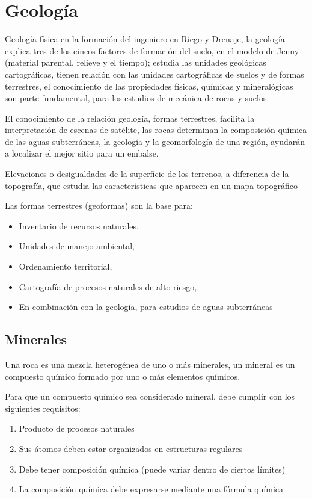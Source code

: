 \chapter{Geología}

Geología física en la formación del ingeniero en Riego y Drenaje, 
la geología explica tres de los cincos factores de formación del suelo, en el modelo de Jenny (material parental, relieve y el tiempo); estudia las unidades geológicas cartográficas, tienen relación con las unidades cartográficas de suelos y de formas terrestres, el conocimiento de las propiedades físicas, químicas y mineralógicas son parte fundamental, para los estudios de mecánica de rocas y suelos.

El conocimiento de la relación geología, formas terrestres, facilita la interpretación de escenas de satélite, las rocas determinan la composición química de las aguas subterráneas, la geología y la geomorfología de una región, ayudarán a localizar el mejor sitio para un embalse.

\begin{definition}[Relieve]
    Elevaciones o desigualdades de la superficie de los terrenos, a diferencia de la topografía, que estudia las características que aparecen en un mapa topográfico
\end{definition}

Las formas terrestres (geoformas) son la base para: 
\begin{itemize}
    \item Inventario de recursos naturales,
    \item Unidades de manejo ambiental,
    \item Ordenamiento territorial,
    \item Cartografía de procesos naturales de alto riesgo,
    \item En combinación con la geología, para estudios de aguas subterráneas
\end{itemize}

\section{Minerales}

Una roca es una mezcla heterogénea de uno o más minerales, un mineral es un compuesto químico formado por uno o más elementos químicos.

Para que un compuesto químico sea considerado mineral, debe cumplir con los siguientes requisitos:

\begin{enumerate}
    \item Producto de procesos naturales
    \item Sus átomos deben estar organizados en estructuras regulares
    \item Debe tener composición química (puede variar dentro de ciertos límites)
    \item La composición química debe expresarse mediante una fórmula química
\end{enumerate}

